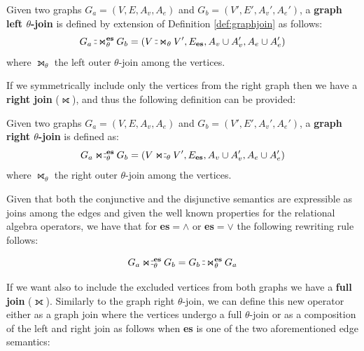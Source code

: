 \begin{definition}\label{def:leftjoin}
	\label{def:graphleftjoin} 
	Given two graphs $G_a=(V,E,A_v,A_e)$ and $G_b=(V',E',A_v',A_e')$, a \textbf{graph left
		$\theta$-join} is defined by extension of Definition \ref{def:graphjoin} as follows:
	\begin{equation*}
	G_a\leftouterjoin_\theta^{\textbf{\textup{es}}} G_b=(V\leftouterjoin_\theta V',E_{\textup{\textbf{es}}},A_v\cup A_v',A_e\cup A_e')
	\end{equation*}
	where $\leftouterjoin_\theta$ the left outer $\theta$-join  among the vertices.
\end{definition}

If we  symmetrically include only the vertices from the right graph then we have a \textbf{right  join} ($\rightouterjoin$), and thus the following definition can be provided:

\begin{definition}\label{def:rightjoin}
	\label{def:graphrightjoin} 
	Given two graphs $G_a=(V,E,A_v,A_e)$ and $G_b=(V',E',A_v',A_e')$, a \textbf{graph right
		$\theta$-join} is defined as:
	\begin{equation*}
	G_a\rightouterjoin_\theta^{\textbf{\textup{es}}} G_b=(V\rightouterjoin_\theta V',E_{\textup{\textbf{es}}},A_v\cup A_v',A_e\cup A_e')
	\end{equation*}
	where $\rightouterjoin_\theta$ the right outer $\theta$-join  among the vertices.
\end{definition}

Given that both the conjunctive and the disjunctive semantics are expressible as joins among the edges and given the well known  properties for the relational algebra operators, we have that for \textbf{es}$=\wedge$ or \textbf{es}$=\vee$ the following rewriting rule follows:

\[G_a\rightouterjoin_\theta^{\textbf{\textup{es}}} G_b = G_b\leftouterjoin_\theta^{\textbf{\textup{es}}} G_a\]

If we want also to include
the excluded vertices from both graphs we have a \textbf{full join}  ($\fullouterjoin$). Similarly to the graph right $\theta$-join, we can define this new operator either as a graph join where the vertices undergo a full $\theta$-join or as a composition of the left and right join as follows when \textbf{es} is one of the two aforementioned edge semantics:

